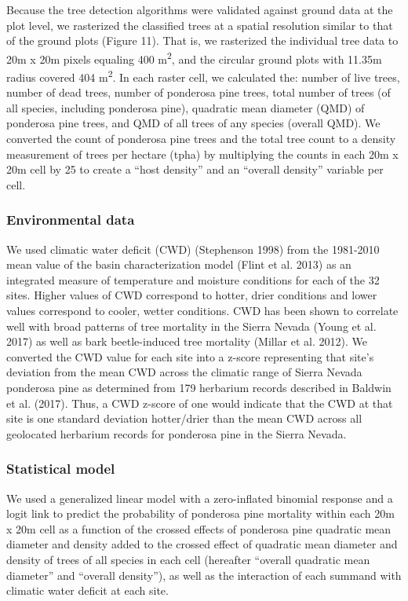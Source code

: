 \documentclass[]{article}
\begin{document}
Because the tree detection algorithms were validated against ground data
at the plot level, we rasterized the classified trees at a spatial
resolution similar to that of the ground plots (Figure 11). That is, we
rasterized the individual tree data to 20m x 20m pixels equaling 400
m\textsuperscript{2}, and the circular ground plots with 11.35m radius
covered 404 m\textsuperscript{2}. In each raster cell, we calculated
the: number of live trees, number of dead trees, number of ponderosa
pine trees, total number of trees (of all species, including ponderosa
pine), quadratic mean diameter (QMD) of ponderosa pine trees, and QMD of
all trees of any species (overall QMD). We converted the count of
ponderosa pine trees and the total tree count to a density measurement
of trees per hectare (tpha) by multiplying the counts in each 20m x 20m
cell by 25 to create a ``host density'' and an ``overall density''
variable per cell.

\subsubsection{Environmental data}\label{environmental-data}

We used climatic water deficit (CWD) (Stephenson 1998) from the
1981-2010 mean value of the basin characterization model (Flint et al.
2013) as an integrated measure of temperature and moisture conditions
for each of the 32 sites. Higher values of CWD correspond to hotter,
drier conditions and lower values correspond to cooler, wetter
conditions. CWD has been shown to correlate well with broad patterns of
tree mortality in the Sierra Nevada (Young et al. 2017) as well as bark
beetle-induced tree mortality (Millar et al. 2012). We converted the CWD
value for each site into a z-score representing that site's deviation
from the mean CWD across the climatic range of Sierra Nevada ponderosa
pine as determined from 179 herbarium records described in Baldwin et
al. (2017). Thus, a CWD z-score of one would indicate that the CWD at
that site is one standard deviation hotter/drier than the mean CWD
across all geolocated herbarium records for ponderosa pine in the Sierra
Nevada.

\subsubsection{Statistical model}\label{statistical-model}

We used a generalized linear model with a zero-inflated binomial
response and a logit link to predict the probability of ponderosa pine
mortality within each 20m x 20m cell as a function of the crossed
effects of ponderosa pine quadratic mean diameter and density added to
the crossed effect of quadratic mean diameter and density of trees of
all species in each cell (hereafter ``overall quadratic mean diameter''
and ``overall density''), as well as the interaction of each summand
with climatic water deficit at each site.
\end{document}
